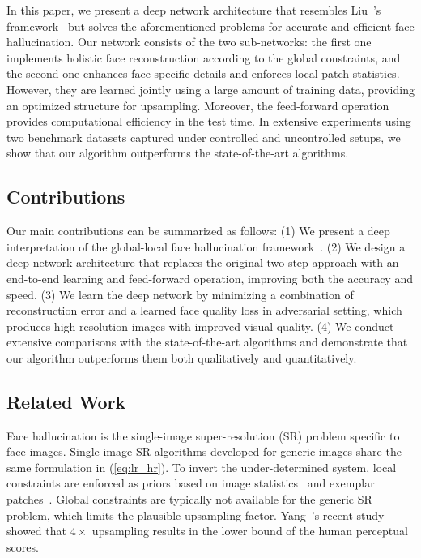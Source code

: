 \documentclass[runningheads]{llncs}
\begin{document}
In this paper, we present a deep network architecture that resembles Liu~\etal's framework~\cite{Liu07} but solves the aforementioned problems for accurate and efficient face hallucination. Our network consists of the two sub-networks: the first one implements holistic face reconstruction according to the global constraints, and the second one enhances face-specific details and enforces local patch statistics. However, they are learned jointly using a large amount of training data, providing an optimized structure for upsampling. Moreover, the feed-forward operation provides computational efficiency in the test time. In extensive experiments using two benchmark datasets captured under controlled and uncontrolled setups, we show that our algorithm outperforms the state-of-the-art algorithms.


\subsection{Contributions}

Our main contributions can be summarized as follows: (1) We present a deep interpretation of the global-local face hallucination framework~\cite{Liu07}. (2) We design a deep network architecture that replaces the original two-step approach with an end-to-end learning and feed-forward operation, improving both the accuracy and speed. (3) We learn the deep network by minimizing a combination of reconstruction error and a learned face quality loss in adversarial setting, which produces high resolution images with improved visual quality. (4) We conduct extensive comparisons with the state-of-the-art algorithms and demonstrate that our algorithm outperforms them both qualitatively and quantitatively.




\subsection{Related Work}

Face hallucination is the single-image super-resolution (SR) problem specific to face images. Single-image SR algorithms developed for generic images share the same formulation in (\ref{eq:lr_hr}). To invert the under-determined system, local constraints are enforced as priors based on image statistics~\cite{fattal2007image,sun2008image,Kim10PAMI} and exemplar patches~\cite{freeman2002example,glasner2009super,yang2010image}. Global constraints are typically not available for the generic SR problem, which limits the plausible upsampling factor. Yang~\etal's recent study~\cite{Yang14ECCV} showed that $4\times$ upsampling results in the lower bound of the human perceptual scores.
\end{document}
